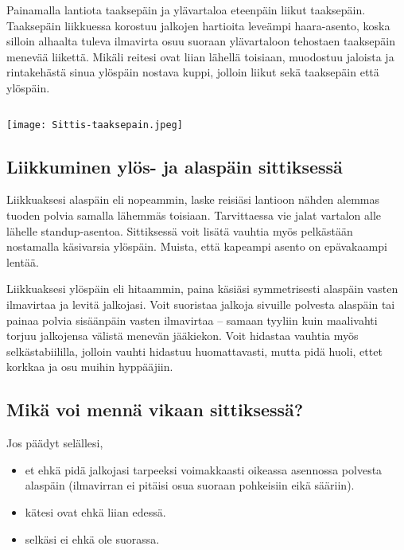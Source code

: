 Painamalla lantiota taaksepäin ja ylävartaloa eteenpäin liikut taaksepäin. Taaksepäin liikkuessa korostuu jalkojen hartioita leveämpi haara-asento, koska silloin alhaalta tuleva ilmavirta osuu suoraan ylävartaloon tehostaen taaksepäin menevää liikettä. Mikäli reitesi ovat liian lähellä toisiaan, muodostuu jaloista ja rintakehästä sinua ylöspäin nostava kuppi, jolloin liikut sekä taaksepäin että ylöspäin. 

\begin{verbatim}                                
\end{verbatim}

\begin{Figure}\centering\texttt{[image: Sittis-taaksepain.jpeg]}\end{Figure} 

\subsection{ Liikkuminen ylös- ja alaspäin sittiksessä }
\label{freefly-lentoasennot-liikkuminen-ylos-ja-alaspain-sittiksessa}


Liikkuaksesi alaspäin eli nopeammin, laske reisiäsi lantioon nähden alemmas tuoden polvia samalla lähemmäs toisiaan. Tarvittaessa vie jalat vartalon alle lähelle standup-asentoa. Sittiksessä voit lisätä vauhtia myös pelkästään nostamalla käsivarsia ylöspäin. Muista, että kapeampi asento on epävakaampi lentää. 


Liikkuaksesi ylöspäin eli hitaammin, paina käsiäsi symmetrisesti alaspäin vasten ilmavirtaa ja levitä jalkojasi. Voit suoristaa jalkoja sivuille polvesta alaspäin tai painaa polvia sisäänpäin vasten ilmavirtaa – samaan tyyliin kuin maalivahti torjuu jalkojensa välistä menevän jääkiekon. Voit hidastaa vauhtia myös selkästabiililla, jolloin vauhti hidastuu huomattavasti, mutta pidä huoli, ettet korkkaa ja osu muihin hyppääjiin. 

\subsection{ Mikä voi mennä vikaan sittiksessä? }
\label{freefly-lentoasennot-mika-voi-menna-vikaan-sittiksessa}


Jos päädyt selällesi, 

\begin{itemize}
\item  et ehkä pidä jalkojasi tarpeeksi voimakkaasti oikeassa asennossa polvesta alaspäin (ilmavirran ei pitäisi osua suoraan pohkeisiin eikä sääriin). 
\item  kätesi ovat ehkä liian edessä. 
\item  selkäsi ei ehkä ole suorassa. 
\end{itemize}

